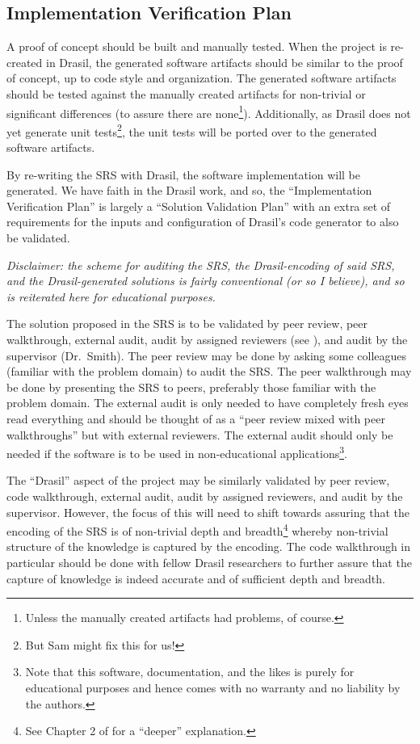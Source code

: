 \documentclass[12pt, titlepage]{article}
\begin{document}
\subsection{Implementation Verification Plan}

A proof of concept should be built and manually tested. When the project is
re-created in Drasil, the generated software artifacts should be similar to the
proof of concept, up to code style and organization. The generated software
artifacts should be tested against the manually created artifacts for
non-trivial or significant differences (to assure there are none\footnote{Unless
the manually created artifacts had problems, of course.}). Additionally, as
Drasil does not yet generate unit tests\footnote{But Sam might fix this for
us!}, the unit tests will be ported over to the generated software artifacts.

By re-writing the SRS with Drasil, the software implementation will be
generated. We have faith in the Drasil work, and so, the ``Implementation
Verification Plan'' is largely a ``Solution Validation Plan'' with an extra set
of requirements for the inputs and configuration of Drasil's code generator to
also be validated. 

\textit{Disclaimer: the scheme for auditing the SRS, the Drasil-encoding of said
SRS, and the Drasil-generated solutions is fairly conventional (or so I
believe), and so is reiterated here for educational purposes.}

The solution proposed in the SRS is to be validated by peer review, peer
walkthrough, external audit, audit by assigned reviewers (see
), and audit by the supervisor (Dr.~Smith). The peer
review may be done by asking some colleagues (familiar with the problem domain)
to audit the SRS. The peer walkthrough may be done by presenting the SRS to
peers, preferably those familiar with the problem domain. The external audit is
only needed to have completely fresh eyes read everything and should be thought
of as a ``peer review mixed with peer walkthroughs'' but with external
reviewers. The external audit should only be needed if the software is to be
used in non-educational applications\footnote{Note that this software,
documentation, and the likes is purely for educational purposes and hence comes
with no warranty and no liability by the authors.}.

The ``Drasil'' aspect of the project may be similarly validated by peer review,
code walkthrough, external audit, audit by assigned reviewers, and audit by the
supervisor. However, the focus of this will need to shift towards assuring that
the encoding of the SRS is of non-trivial depth and breadth\footnote{See Chapter
2 of \cite{Balaci2022MSc} for a ``deeper'' explanation.} whereby non-trivial
structure of the knowledge is captured by the encoding. The code walkthrough in
particular should be done with fellow Drasil researchers to further assure that
the capture of knowledge is indeed accurate and of sufficient depth and breadth.
\end{document}
